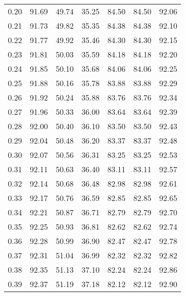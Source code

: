 \begin{tabular}{|c|c|c|c|c|c|c|}
      0.20 &     91.69 &     49.74 &      35.25 &   84.50 &      84.50 &         92.06 \\
      0.21 &     91.73 &     49.82 &      35.35 &   84.38 &      84.38 &         92.10 \\
      0.22 &     91.77 &     49.92 &      35.46 &   84.30 &      84.30 &         92.15 \\
      0.23 &     91.81 &     50.03 &      35.59 &   84.18 &      84.18 &         92.20 \\
      0.24 &     91.85 &     50.10 &      35.68 &   84.06 &      84.06 &         92.25 \\
      0.25 &     91.88 &     50.16 &      35.78 &   83.88 &      83.88 &         92.29 \\
      0.26 &     91.92 &     50.24 &      35.88 &   83.76 &      83.76 &         92.34 \\
      0.27 &     91.96 &     50.33 &      36.00 &   83.64 &      83.64 &         92.39 \\
      0.28 &     92.00 &     50.40 &      36.10 &   83.50 &      83.50 &         92.43 \\
      0.29 &     92.04 &     50.48 &      36.20 &   83.37 &      83.37 &         92.48 \\
      0.30 &     92.07 &     50.56 &      36.31 &   83.25 &      83.25 &         92.53 \\
      0.31 &     92.11 &     50.63 &      36.40 &   83.11 &      83.11 &         92.57 \\
      0.32 &     92.14 &     50.68 &      36.48 &   82.98 &      82.98 &         92.61 \\
      0.33 &     92.17 &     50.76 &      36.59 &   82.85 &      82.85 &         92.65 \\
      0.34 &     92.21 &     50.87 &      36.71 &   82.79 &      82.79 &         92.70 \\
      0.35 &     92.25 &     50.93 &      36.81 &   82.62 &      82.62 &         92.74 \\
      0.36 &     92.28 &     50.99 &      36.90 &   82.47 &      82.47 &         92.78 \\
      0.37 &     92.31 &     51.04 &      36.99 &   82.32 &      82.32 &         92.82 \\
      0.38 &     92.35 &     51.13 &      37.10 &   82.24 &      82.24 &         92.86 \\
      0.39 &     92.37 &     51.19 &      37.18 &   82.12 &      82.12 &         92.90 \\

\end{tabular}
